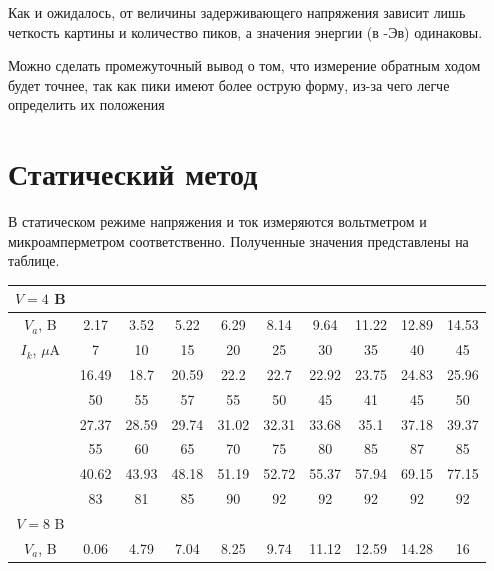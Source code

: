 \documentclass[a4paper, 14pt]{extarticle}%
\begin{document}
Как и ожидалось, от величины задерживающего напряжения зависит лишь четкость картины и количество пиков, а значения энергии (в -Эв) одинаковы. 

Можно сделать промежуточный вывод о том, что измерение обратным ходом будет точнее, так как пики имеют более острую форму, из-за чего легче определить их положения

\section*{Статический метод}

В статическом режиме напряжения и ток измеряются вольтметром и микроамперметром соответственно. Полученные значения представлены на таблице. 
\begin{table}[h]
\begin{center}
\begin{tabular}{|c|c|c|c|c|c|c|c|c|c|}
\hline
\rowcolor[HTML]{6665CD} 
$V = 4$ B     &       &       &       &       &       &       &       &       &       \\ \hline
\rowcolor[HTML]{9698ED} 
$V_a$, B      & 2.17  & 3.52  & 5.22  & 6.29  & 8.14  & 9.64  & 11.22 & 12.89 & 14.53 \\ \hline
$I_k$, $\mu$A & 7     & 10    & 15    & 20    & 25    & 30    & 35    & 40    & 45    \\ \hline
\rowcolor[HTML]{9698ED} 
              & 16.49 & 18.7  & 20.59 & 22.2  & 22.7  & 22.92 & 23.75 & 24.83 & 25.96 \\ \hline
              & 50    & 55    & 57    & 55    & 50    & 45    & 41    & 45    & 50    \\ \hline
\rowcolor[HTML]{9698ED} 
              & 27.37 & 28.59 & 29.74 & 31.02 & 32.31 & 33.68 & 35.1  & 37.18 & 39.37 \\ \hline
              & 55    & 60    & 65    & 70    & 75    & 80    & 85    & 87    & 85    \\ \hline
\rowcolor[HTML]{9698ED} 
              & 40.62 & 43.93 & 48.18 & 51.19 & 52.72 & 55.37 & 57.94 & 69.15 & 77.15 \\ \hline
              & 83    & 81    & 85    & 90    & 92    & 92    & 92    & 92    & 92    \\ \hline
\rowcolor[HTML]{6665CD} 
$V = 8$ B     &       &       &       &       &       &       &       &       &       \\ \hline
\rowcolor[HTML]{9698ED} 
$V_a$, B      & 0.06  & 4.79  & 7.04  & 8.25  & 9.74  & 11.12 & 12.59 & 14.28 & 16    \\ \hline

\end{tabular}
\end{center}
\end{table}
\end{document}
